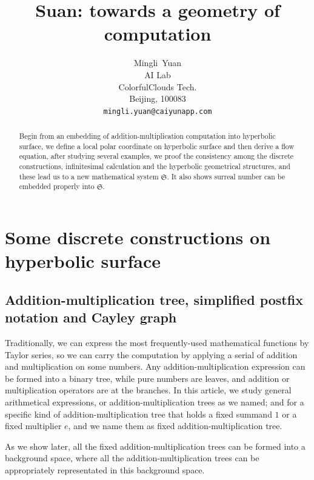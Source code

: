 \documentclass{article}
\title{Suan: towards a geometry of computation}
\author{
  Mingli~Yuan \\
  AI Lab \\
  ColorfulClouds Tech.\\
  Beijing, 100083 \\
  \texttt{mingli.yuan@caiyunapp.com} \\
}
\begin{document}
\maketitle

\begin{abstract}
    Begin from an embedding of addition-multiplication computation into hyperbolic surface, we define a local polar
    coordinate on hyperbolic surface and then derive a flow equation, after studying several examples, we proof the
    consistency among the discrete constructions, infinitesimal calculation and the hyperbolic geometrical structures, and
    these lead us to a new mathematical system $\mathfrak{S}$. It also shows surreal number can be embedded properly
    into $\mathfrak{S}$.
\end{abstract}


\setcounter{tocdepth}{2}
\tableofcontents

\section{Some discrete constructions on hyperbolic surface}\label{sec:sdcohs}

\subsection{Addition-multiplication tree, simplified postfix notation and Cayley graph}\label{sec:amt}

Traditionally, we can express the most frequently-used mathematical functions by Taylor series,
so we can carry the computation by applying a serial of addition and multiplication on some numbers.
Any addition-multiplication expression can be formed into a binary tree, while pure numbers are leaves,
and addition or multiplication operators are at the branches. In this article, we study general arithmetical
expressions, or addition-multiplication trees as we named; and for a specific kind of addition-multiplication tree
that holds a fixed summand $1$ or a fixed multiplier $e$, and we name them as fixed addition-multiplication tree.

As we show later, all the fixed addition-multiplication trees can be formed into a background space,
where all the addition-multiplication trees can be appropriately representated in this background space.
\end{document}
